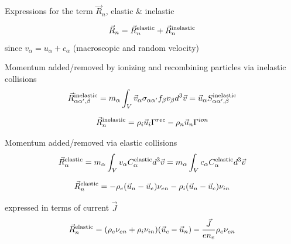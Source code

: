 \documentclass{beamer}
\begin{document}
\begin{frame}{Expressions for the term $\vec{R}_n$, elastic \& inelastic}

{\small
\begin{equation} \nonumber
\vec{R}_n=\vec{R}_n^{\rm elastic} + \vec{R}_n^{\rm inelastic}
\end{equation}
since $v_\alpha = u_\alpha + c_\alpha$ (macroscopic and random velocity)

Momentum added/removed by ionizing and recombining particles via inelastic collisions
\begin{eqnarray} \nonumber
\vec{R}_{\alpha\alpha',\beta}^{\rm inelastic} = m_\alpha \int_V{\vec{v}_\alpha \sigma_{\alpha \alpha'} f_{\beta} v_{\beta} d^3\vec{v} } = \vec{u}_\alpha S_{\alpha\alpha',\beta}^{\rm inelastic}    
\end{eqnarray}

\begin{equation} \nonumber
\vec{R}_n^{\rm inelastic} = \rho_i \vec{u}_i \Gamma^{rec} - \rho_n \vec{u}_n \Gamma^{ion} 
\end{equation}

Momentum added/removed via elastic collisions
\begin{eqnarray}  \nonumber
\vec{R}_\alpha^{\rm elastic} = m_\alpha \int_V{v_\alpha C_\alpha^{\rm elastic} d^3\vec{v} } = m_\alpha \int_V{c_\alpha C_\alpha^{\rm elastic} d^3\vec{v} } 
\end{eqnarray}

\begin{eqnarray}  \nonumber
\vec{R}_n^{\rm elastic}  = -\rho_e(\vec{u}_n - \vec{u}_e) \nu_{en} - \rho_i(\vec{u}_n - \vec{u}_c) \nu_{in}
\end{eqnarray}

expressed in terms of current $\vec{J}$
\begin{eqnarray} \nonumber
\vec{R}_n^{\rm elastic} = (\rho_e\nu_{en} + \rho_i\nu_{in})(\vec{u}_c - \vec{u}_n) - \frac{\vec{J}}{en_e}\rho_e\nu_{en}
\end{eqnarray}

}

\end{frame}
\end{document}
